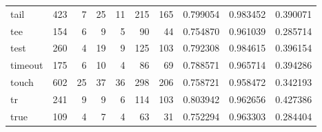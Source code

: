 \begin{longtable}{lrrrrrrrrr}
tail      &                    423 &                                  7 &                                25 &                               11 &                               215 &                             165 &                                0.799054 &                               0.983452 &                             0.390071 \\
tee       &                    154 &                                  6 &                                 9 &                                5 &                                90 &                              44 &                                0.754870 &                               0.961039 &                             0.285714 \\
test      &                    260 &                                  4 &                                19 &                                9 &                               125 &                             103 &                                0.792308 &                               0.984615 &                             0.396154 \\
timeout   &                    175 &                                  6 &                                10 &                                4 &                                86 &                              69 &                                0.788571 &                               0.965714 &                             0.394286 \\
touch     &                    602 &                                 25 &                                37 &                               36 &                               298 &                             206 &                                0.758721 &                               0.958472 &                             0.342193 \\
tr        &                    241 &                                  9 &                                 9 &                                6 &                               114 &                             103 &                                0.803942 &                               0.962656 &                             0.427386 \\
true      &                    109 &                                  4 &                                 7 &                                4 &                                63 &                              31 &                                0.752294 &                               0.963303 &                             0.284404 \\

\end{longtable}
